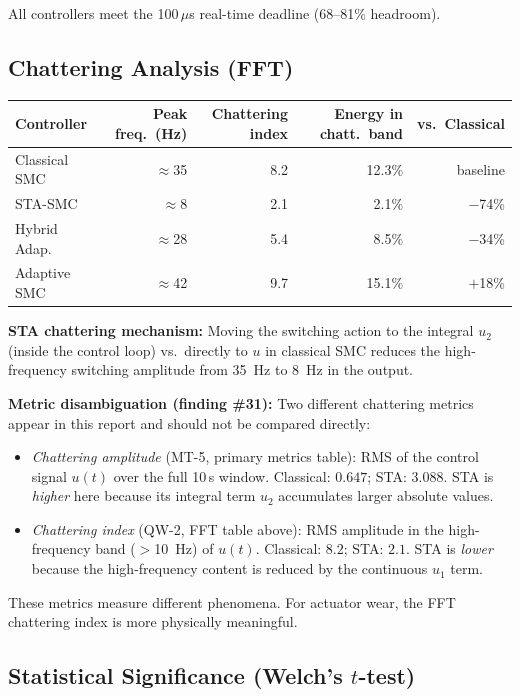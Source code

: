 \documentclass[11pt, a4paper]{article}
\begin{document}
All controllers meet the 100\,$\mu$s real-time deadline (68--81\% headroom).

\subsection{Chattering Analysis (FFT)}

\begin{center}
\begin{tabular}{@{}p{3.5cm}rrrr@{}}
\toprule
\textbf{Controller} &
  \textbf{Peak freq.\ (Hz)} &
  \textbf{Chattering index} &
  \textbf{Energy in chatt.\ band} &
  \textbf{vs.\ Classical} \\
\midrule
Classical SMC & $\approx$35  & 8.2  & 12.3\% & baseline \\
STA-SMC       & $\approx$8   & 2.1  & 2.1\%  & $-$74\% \\
Hybrid Adap.  & $\approx$28  & 5.4  & 8.5\%  & $-$34\% \\
Adaptive SMC  & $\approx$42  & 9.7  & 15.1\% & $+$18\% \\
\bottomrule
\end{tabular}
\end{center}

\textbf{STA chattering mechanism:} Moving the switching action to the integral
$u_2$ (inside the control loop) vs.\ directly to $u$ in classical SMC reduces
the high-frequency switching amplitude from 35~Hz to 8~Hz in the output.

\textbf{Metric disambiguation (finding \#31):} Two different chattering
metrics appear in this report and should not be compared directly:
\begin{itemize}[noitemsep]
  \item \textit{Chattering amplitude} (MT-5, primary metrics table):
        RMS of the control signal $u(t)$ over the full 10\,s window.
        Classical: $0.647$; STA: $3.088$. STA is \textit{higher} here because
        its integral term $u_2$ accumulates larger absolute values.
  \item \textit{Chattering index} (QW-2, FFT table above):
        RMS amplitude in the high-frequency band ($>$10~Hz) of $u(t)$.
        Classical: $8.2$; STA: $2.1$. STA is \textit{lower} because the
        high-frequency content is reduced by the continuous $u_1$ term.
\end{itemize}
These metrics measure different phenomena. For actuator wear, the FFT
chattering index is more physically meaningful.

\subsection{Statistical Significance (Welch's $t$-test)}
\end{document}
